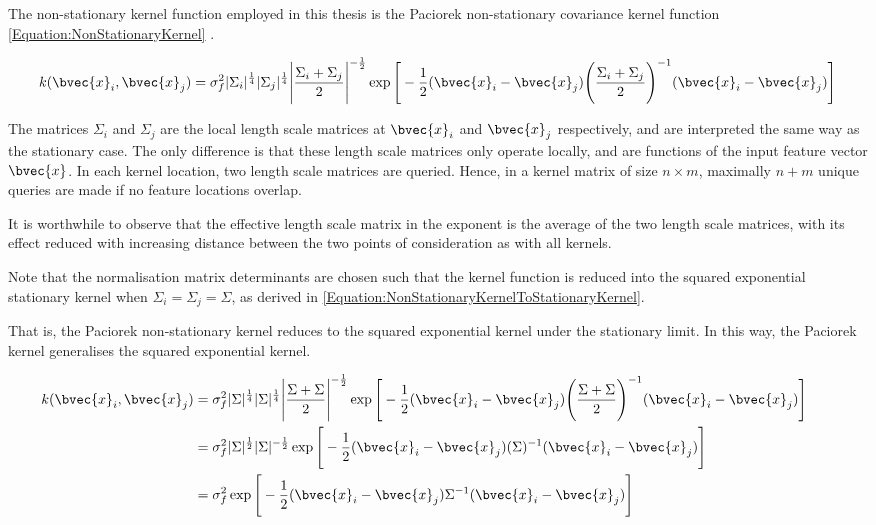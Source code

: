 				The non-stationary kernel function employed in this thesis is the Paciorek non-stationary covariance kernel function \eqref{Equation:NonStationaryKernel} \citep{AdaptiveNonStationaryKernel}.
				
				\begin{equation}
					k(\bvec{x}_{i}, \bvec{x}_{j}) = \sigma_{f}^{2} |\Sigma_{i}|^{\frac{1}{4}} |\Sigma_{j}|^{\frac{1}{4}} \Bigg|\frac{\Sigma_{i} + \Sigma_{j}}{2}\Bigg|^{-\frac{1}{2}} \exp\Bigg[ -\frac{1}{2} (\bvec{x}_{i} - \bvec{x}_{j}) \Bigg(\frac{\Sigma_{i} + \Sigma_{j}}{2}\Bigg)^{-1} (\bvec{x}_{i} - \bvec{x}_{j}) \Bigg]
				\label{Equation:NonStationaryKernel}
				\end{equation}			
				
				The matrices $\Sigma_{i}$ and $\Sigma_{j}$ are the local length scale matrices at $\bvec{x}_{i}$ and $\bvec{x}_{j}$ respectively, and are interpreted the same way as the stationary case. The only difference is that these length scale matrices only operate locally, and are functions of the input feature vector $\bvec{x}$. In each kernel location, two length scale matrices are queried. Hence, in a kernel matrix of size $n \times m$, maximally $n + m$ unique queries are made if no feature locations overlap.
				
				It is worthwhile to observe that the effective length scale matrix in the exponent is the average of the two length scale matrices, with its effect reduced with increasing distance between the two points of consideration as with all kernels.
				
				Note that the normalisation matrix determinants are chosen such that the kernel function is reduced into the squared exponential stationary kernel when $\Sigma_{i} = \Sigma_{j} = \Sigma$, as derived in \eqref{Equation:NonStationaryKernelToStationaryKernel}. 
		
				That is, the Paciorek non-stationary kernel reduces to the squared exponential kernel under the stationary limit. In this way, the Paciorek kernel generalises the squared exponential kernel.
						
				\begin{equation}
					\left.
						\begin{aligned}
							k(\bvec{x}_{i}, \bvec{x}_{j}) &= \sigma_{f}^{2} |\Sigma|^{\frac{1}{4}} |\Sigma|^{\frac{1}{4}} \Bigg|\frac{\Sigma + \Sigma}{2}\Bigg|^{-\frac{1}{2}} \exp\Bigg[ -\frac{1}{2} (\bvec{x}_{i} - \bvec{x}_{j}) \Bigg(\frac{\Sigma + \Sigma}{2}\Bigg)^{-1} (\bvec{x}_{i} - \bvec{x}_{j}) \Bigg] \\
							&= \sigma_{f}^{2} |\Sigma|^{\frac{1}{2}} |\Sigma|^{-\frac{1}{2}} \exp\Bigg[ -\frac{1}{2} (\bvec{x}_{i} - \bvec{x}_{j}) (\Sigma)^{-1} (\bvec{x}_{i} - \bvec{x}_{j}) \Bigg] \\
							&= \sigma_{f}^{2} \exp\Bigg[ -\frac{1}{2} (\bvec{x}_{i} - \bvec{x}_{j}) \Sigma^{-1} (\bvec{x}_{i} - \bvec{x}_{j}) \Bigg]
						\end{aligned}
					\qquad \right.
				\label{Equation:NonStationaryKernelToStationaryKernel}
				\end{equation}		
			
